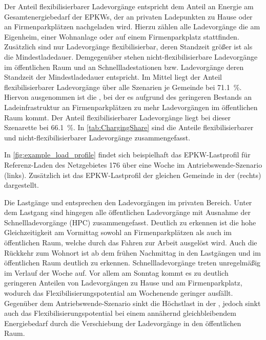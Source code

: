 Der Anteil flexibilisierbarer Ladevorgänge entspricht dem Anteil an Energie am Gesamtenergiebedarf der \glspl{EPKW}, der an privaten Ladepunkten zu Hause oder an Firmenparkplätzen nachgeladen wird.
Hierzu zählen alle Ladevorgänge die am Eigenheim, einer Wohnanlage oder auf einem Firmenparkplatz stattfinden.
Zusätzlich sind nur Ladevorgänge flexibilisierbar, deren Standzeit größer ist als die Mindestladedauer.
Demgegenüber stehen nicht-flexibilisierbare Ladevorgänge im öffentlichen Raum und an Schnellladestationen bzw. Ladevorgänge deren Standzeit der Mindestladedauer entspricht.
Im Mittel liegt der Anteil flexibilisierbarer Ladevorgänge über alle Szenarien je Gemeinde bei \SI{71.1}{\percent}.
Hiervon ausgenommen ist die \SzeFirmenparkplatzdot, bei der es aufgrund des geringeren Bestands an Ladeinfrastruktur an Firmenparkplätzen zu mehr Ladevorgängen im öffentlichen Raum kommt.
Der Anteil flexibilisierbarer Ladevorgänge liegt bei dieser Szenarette bei \SI{66.1}{\percent}.
In \autoref{tab:ChargingShare} sind die Anteile flexibilisierbarer und nicht-flexibilisierbarer Ladevorgänge zusammengefasst.



In \autoref{fig:example_load_profile} findet sich beispielhaft das \gls{EPKW}-Lastprofil für Referenz-Laden des Netzgebietes \num{176} über eine Woche im Antriebswende-Szenario (links).
Zusätzlich ist das \gls{EPKW}-Lastprofil der gleichen Gemeinde in der \SzeFirmenparkplatz (rechts) dargestellt.


Die Lastgänge \zH und \Firmeparkplatz entsprechen den Ladevorgängen im privaten Bereich.
Unter dem Lastgang \oeffen sind hingegen alle öffentlichen Ladevorgänge mit Ausnahme der Schnellladevorgänge (\gls{HPC}) zusammengefasst.
Deutlich zu erkennen ist die hohe Gleichzeitigkeit am Vormittag sowohl an Firmenparkplätzen als auch im öffentlichen Raum, welche durch das Fahren zur Arbeit ausgelöst wird.
Auch die Rückkehr zum Wohnort ist ab dem frühen Nachmittag in den Lastgängen \zH und im öffentlichen Raum deutlich zu erkennen.
Schnellladevorgänge treten unregelmäßig im Verlauf der Woche auf.
Vor allem am Sonntag kommt es zu deutlich geringeren Anteilen von Ladevorgängen zu Hause und am Firmenparkplatz, wodurch das Flexibilisierungspotential am Wochenende geringer ausfällt.
Gegenüber dem Antriebswende-Szenario sinkt die Höchstlast in der \SzeFirmenparkplatzdot, jedoch sinkt auch das Flexibilisierungspotential bei einem annähernd gleichbleibendem Energiebedarf durch die Verschiebung der Ladevorgänge in den öffentlichen Raum.\medskip

